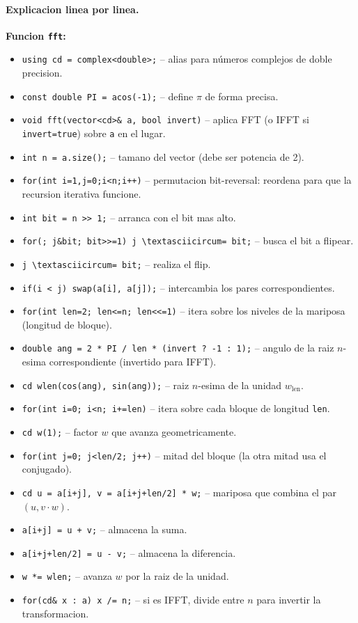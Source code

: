 \paragraph{Explicacion linea por linea.}
\textbf{Funcion \texttt{fft}:}
\begin{itemize}\setlength\itemsep{0pt}
	\item \verb|using cd = complex<double>;| -- alias para n\'umeros complejos de doble precision.
	\item \verb|const double PI = acos(-1);| -- define $\pi$ de forma precisa.
	\item \verb|void fft(vector<cd>& a, bool invert)| -- aplica FFT (o IFFT si \verb|invert=true|) sobre \texttt{a} en el lugar.
	\item \verb|int n = a.size();| -- tamano del vector (debe ser potencia de 2).
	\item \verb|for(int i=1,j=0;i<n;i++)| -- permutacion bit-reversal: reordena para que la recursion iterativa funcione.
	\item \verb|int bit = n >> 1;| -- arranca con el bit mas alto.
	\item \verb|for(; j&bit; bit>>=1) j \textasciicircum= bit;| -- busca el bit a flipear.
	\item \verb|j \textasciicircum= bit;| -- realiza el flip.
	\item \verb|if(i < j) swap(a[i], a[j]);| -- intercambia los pares correspondientes.
	\item \verb|for(int len=2; len<=n; len<<=1)| -- itera sobre los niveles de la mariposa (longitud de bloque).
	\item \verb|double ang = 2 * PI / len * (invert ? -1 : 1);| -- angulo de la raiz $n$-esima correspondiente (invertido para IFFT).
	\item \verb|cd wlen(cos(ang), sin(ang));| -- raiz $n$-esima de la unidad $w_{\text{len}}$.
	\item \verb|for(int i=0; i<n; i+=len)| -- itera sobre cada bloque de longitud \texttt{len}.
	\item \verb|cd w(1);| -- factor $w$ que avanza geometricamente.
	\item \verb|for(int j=0; j<len/2; j++)| -- mitad del bloque (la otra mitad usa el conjugado).
	\item \verb|cd u = a[i+j], v = a[i+j+len/2] * w;| -- mariposa que combina el par $(u, v \cdot w)$.
	\item \verb|a[i+j] = u + v;| -- almacena la suma.
	\item \verb|a[i+j+len/2] = u - v;| -- almacena la diferencia.
	\item \verb|w *= wlen;| -- avanza $w$ por la raiz de la unidad.
	\item \verb|for(cd& x : a) x /= n;| -- si es IFFT, divide entre $n$ para invertir la transformacion.
\end{itemize}
